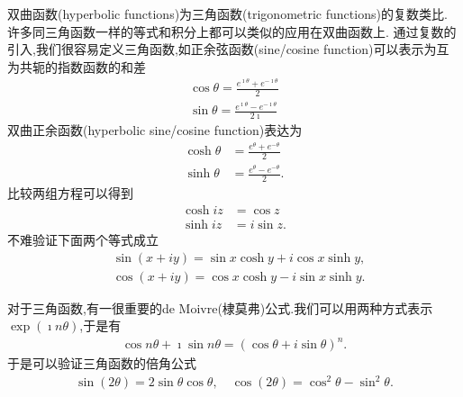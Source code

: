 双曲函数(hyperbolic functions)为三角函数(trigonometric functions)的复数类比.
许多同三角函数一样的等式和积分上都可以类似的应用在双曲函数上.
通过复数的引入,我们很容易定义三角函数,如正余弦函数(sine/cosine function)可以表示为互为共轭的指数函数的和差
\begin{align}
    \cos \theta = \frac{e^{\imath \theta} + e^{ -\imath \theta} }{2}
    \\
    \sin \theta = \frac{e^{\imath \theta} - e^{ -\imath \theta} }{2\imath}
\end{align}
双曲正余函数(hyperbolic sine/cosine function)表达为
\begin{align}
    \cosh \theta &= \frac{e^{\theta} + e^{ - \theta} }{2}
    \\
    \sinh \theta &= \frac{e^{\theta} - e^{ - \theta} }{2} .
\end{align}
比较两组方程可以得到
\begin{align}
    \cosh iz &= \cos z
    \\
    \sinh iz &= i \sin z.
\end{align}
不难验证下面两个等式成立
\begin{equation}
    \begin{aligned}
    & \sin (x+i y)=\sin x \cosh y+i \cos x \sinh y, \\
    & \cos (x+i y)=\cos x \cosh y-i \sin x \sinh y.
    \end{aligned}
\end{equation}

对于三角函数,有一很重要的de Moivre(棣莫弗)公式.我们可以用两种方式表示$\exp(\imath n \theta)$,于是有
\begin{align}
    \cos n \theta + \imath \sin n\theta = (\cos \theta + i \sin \theta)^n  .
\end{align}
于是可以验证三角函数的倍角公式
\begin{align}
    \sin(2\theta) = 2\sin\theta \cos\theta, \quad \cos (2\theta) = \cos^2\theta - \sin^2\theta .
\end{align}

